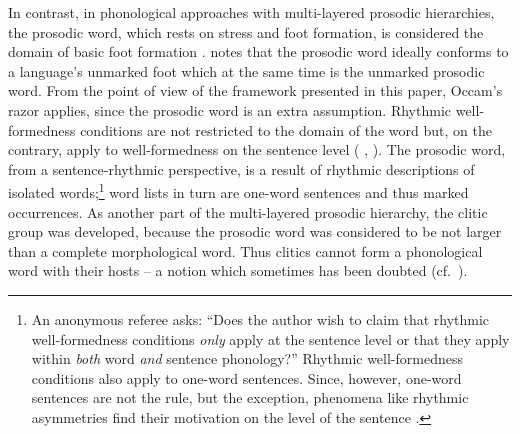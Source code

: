 \documentclass[output=paper
  ,nobabel
  ,uniformtopskip %
]{langscibook}
\begin{document}
In contrast, in phonological approaches with multi-layered prosodic hierarchies, the prosodic word,
which rests on stress and foot formation, is considered the domain of basic foot formation
\citep[\eg][]{NesporVogel1986}. \citet[147]{Fery2000} notes that the prosodic word ideally conforms
to a language’s unmarked foot which at the same time is the unmarked prosodic word. From the point
of view of the framework presented in this paper, Occam’s razor applies, since the prosodic word is
an extra assumption. Rhythmic well-formedness conditions are not restricted to the domain of the
word but, on the contrary, apply to well-formedness on the sentence level (\eg
\citealp[58]{Vennemann1986}, \citealp{NoelAzizHanna2003}). The prosodic word, from a
sentence-rhythmic perspective, is a result of rhythmic descriptions of isolated words;\footnote{An
  anonymous referee asks: ``Does the author wish to claim that rhythmic well-formedness conditions
  \emph{only} apply at the sentence level or that they apply within \emph{both} word \emph{and}
  sentence phonology?'' Rhythmic well-formedness conditions also apply to one-word sentences. Since,
  however, one-word sentences are not the rule, but the exception, phenomena like rhythmic
  asymmetries find their motivation on the level of the sentence \citep{NoelAzizHanna2008b}.} word
lists in turn are one-word sentences and thus marked occurrences.
As another part of the multi-layered prosodic hierarchy, the clitic group was developed, because the
prosodic word was considered to be not larger than a complete morphological word. Thus clitics
cannot form a phonological word with their hosts – a notion which sometimes has been doubted (cf.\
\eg  \citealp[54]{Stechow93a}).  
\end{document}
